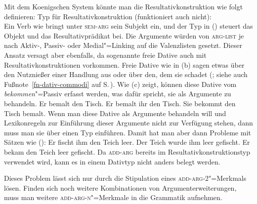 Mit dem Koenigschen System könnte man die Resultativkonstruktion wie folgt definieren:
\eas
Typ für Resultativkonstruktion (funktioniert auch nicht):\\
\zs
Ein Verb wie  bringt unter \textsc{sem-arg} sein Subjekt ein, und der
Typ in () steuert das Objekt und das Resultativprädikat bei. Die Argumente
würden von \textsc{arg-list} je nach Aktiv-, Passiv- oder Medial"=Linking
auf die Valenzlisten gesetzt. Dieser Ansatz versagt aber ebenfalls, da sogenannte freie
Dative auch mit Resultativkonstruktionen vorkommen. Freie
Dative wie in
(b) sagen etwas über den Nutznießer einer Handlung aus oder über den, dem sie schadet
(\citealt[]{Wegener85b}; siehe auch Fußnote~\ref{fn-dativ-commodi} auf S.\,\pageref{fn-dativ-commodi}).
Wie (c) zeigt, können diese Dative vom \emph{bekommen}"=Passiv
erfasst werden, was dafür spricht, sie als Argumente zu behandeln.
\eal
\ex Er bemalt den Tisch.
\ex Er bemalt ihr den Tisch.
\ex Sie bekommt den Tisch bemalt.
\zl
Wenn man diese Dative als Argumente behandeln will und Lexikonregeln zur Einführung
dieser Argumente nicht zur Verfügung stehen, dann muss man sie über einen Typ einführen.
Damit hat man aber dann Probleme mit Sätzen wie ():
\eal
\ex Er fischt ihm den Teich leer.
\ex Der Teich wurde ihm leer gefischt.
\ex Er bekam den Teich leer gefischt.
\zl
Da \textsc{add-arg} bereits im Resultativkonstruktionstyp verwendet wird, kann es in einem
Dativtyp nicht anders belegt werden.

Dieses Problem lässt sich nur durch die Stipulation eines \textsc{add-arg-2}"=Merkmals lösen. Finden
sich noch weitere Kombinationen von Argumenterweiterungen, muss man weitere \textsc{add-arg-n}"=Merkmale
in die Grammatik aufnehmen.

